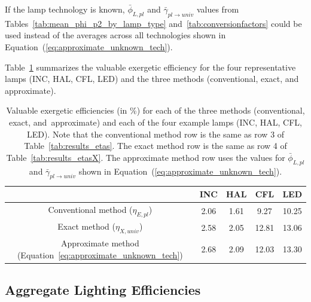 \documentclass[energies,article,accept,moreauthors,pdftex]{Definitions/mdpi}\usepackage[]{graphicx}\usepackage[]{color}
\newcommand{\gammaratavg}{\bar{\gamma}_{pl\rightarrow{}univ}}
\begin{document}
If the lamp technology is known, 
$\bar{\phi}_{L,pl}$ and $\gammaratavg{}$ values 
from Tables~\ref{tab:mean_phi_p2_by_lamp_type} and~\ref{tab:conversionfactors} 
could be used instead of the averages across all technologies shown in Equation~(\ref{eq:approximate_unknown_tech}).

Table~\ref{tab:threemethods} summarizes 
the valuable exergetic efficiency 
for the four representative lamps (INC, HAL, CFL, LED) and
the three methods (conventional, exact, and approximate).


\begin{table}[H]
\centering
\caption{Valuable exergetic efficiencies (in \%)
                     for each of the three methods
                     (conventional, exact, \mbox{and approximate}) and
                     each of the four example lamps
                     (INC, HAL, CFL, LED).
                     Note that the conventional method row is the same as
                     row 3 of Table~\ref{tab:results_etas}.
                     The exact method row is the same as
                     row 4 of Table~\ref{tab:results_etasX}.
                     The approximate method row uses
                     the values for $\bar{\phi}_{L,pl}$ and $\gammaratavg{}$ shown
                     in Equation~(\ref{eq:approximate_unknown_tech}).} 
\label{tab:threemethods}
\begingroup\footnotesize
\begin{tabular}{ccccc}
  \toprule
 & \textbf{INC} & \textbf{HAL} & \textbf{CFL} & \textbf{LED} \\ 
  \midrule
Conventional method ($\eta_{E,pl}$) & 2.06 & 1.61 & 9.27 & 10.25 \\ 
  Exact method ($\eta_{X,univ}$) & 2.58 & 2.05 & 12.81 & 13.06 \\ 
  Approximate method (Equation~\eqref{eq:approximate_unknown_tech}) & 2.68 & 2.09 & 12.03 & 13.30 \\ 
   \bottomrule
\end{tabular}
\endgroup
\end{table}



\subsection{Aggregate Lighting Efficiencies}
\label{sec:AggEfficiencies}
\end{document}
